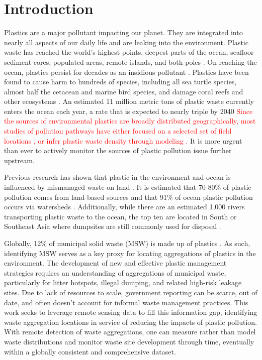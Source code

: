 \documentclass[10pt,letterpaper]{article}
\begin{document}
\linenumbers
\section*{Introduction}
Plastics are a major pollutant impacting our planet. They are integrated into nearly all aspects of our daily life and are leaking into the environment. Plastic waste has reached the world’s highest points, deepest parts of the ocean, seafloor sediment cores, populated areas, remote islands, and both poles \cite{napper2021abundance}\cite{chiba2018human}\cite{kelly2020microplastic}\cite{brandon2019multidecadal}\cite{lavers2020entrapment}\cite{browne2011accumulation}. On reaching the ocean, plastics persist for decades as an insidious pollutant \cite{lebreton2019global}\cite{worm2017plastic}. Plastics have been found to cause harm to hundreds of species, including all sea turtle species, almost half the cetacean and marine bird species, and damage coral reefs and other ecosystems \cite{harding2016marine}\cite{lamb2018plastic}\cite{beaumont2019global}. An estimated 11 million metric tons of plastic waste currently enters the ocean each year, a rate that is expected to nearly triple by 2040 \cite{lau2020evaluating} \textcolor{red}{Since the sources of environmental plastics are broadly distributed geographically, most studies of pollution pathways have either focused on a selected set of field locations \cite{jambeck2015plastic}, or infer plastic waste density through modeling \cite{lebreton2019future}\cite{SIEGFRIED2017249}.} It is more urgent than ever to actively monitor the sources of plastic pollution issue further upstream.

Previous research has shown that plastic in the environment and ocean is influenced by mismanaged waste on land \cite{jambeck2015plastic}\cite{borrelle2020predicted}. It is estimated that 70-80\% of plastic pollution comes from land-based sources and that 91\% of ocean plastic pollution occurs via watersheds \cite{lebreton2019future}. Additionally, while there are an estimated 1,000 rivers transporting plastic waste to the ocean, the top ten are located in South or Southeast Asia where dumpsites are still commonly used for disposal \cite{meijer2021more}\cite{dhokhikah2012solid}\cite{kaza2018waste}. 

Globally, 12\% of municipal solid waste (MSW) is made up of plastics \cite{kaza2018waste}. As such, identifying MSW serves as a key proxy for locating aggregations of plastics in the environment. The development of new and effective plastic management strategies requires an understanding of aggregations of municipal waste, particularly for litter hotspots, illegal dumping, and related high-risk leakage sites. Due to lack of resources to scale, government reporting can be scarce, out of date, and often doesn’t account for informal waste management practices. This work seeks to leverage remote sensing data to fill this information gap, identifying waste aggregation locations in service of reducing the impacts of plastic pollution. With remote detection of waste aggregations, one can measure rather than model waste distributions and monitor waste site development through time, eventually within a globally consistent and comprehensive dataset.
\end{document}
